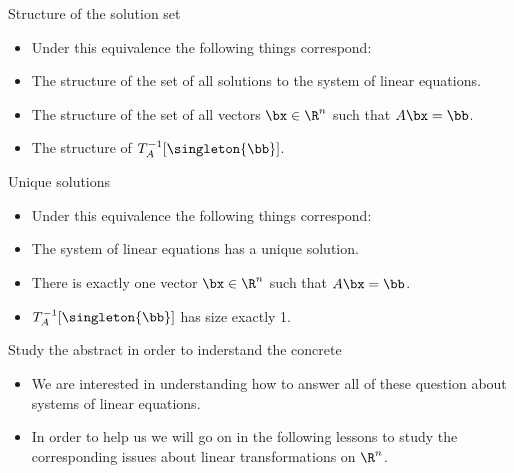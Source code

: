 \documentclass{beamer}
\begin{document}

\begin{frame}{Structure of the solution set}

\begin{itemize}
\item Under this equivalence the following things correspond:
\item The structure of the set of all solutions to the system of linear equations.
\item The structure of the set of all vectors $\bx \in \R^n$ such that $A \bx = \bb$.
\item The structure of $T_A^{-1}[\singleton{\bb}]$.
\end{itemize}

\end{frame}


\begin{frame}{Unique solutions}

\begin{itemize}
\item Under this equivalence the following things correspond:
\item The system of linear equations has a unique solution.
\item There is exactly one vector $\bx \in \R^n$ such that $A \bx = \bb$.
\item $T_A^{-1}[\singleton{\bb}]$ has size exactly 1.
\end{itemize}

\end{frame}


\begin{frame}{Study the abstract in order to inderstand the concrete}

\begin{itemize}
\item We are interested in understanding how to answer all of these question
about systems of linear equations.
\item In order to help us we will go on in the following lessons to
study the corresponding issues about linear transformations on $\R^n$.
\end{itemize}

\end{frame}
\end{document}
